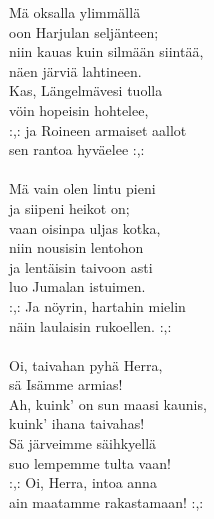 
            Mä oksalla ylimmällä  \\
            oon Harjulan seljänteen; \\
            niin kauas kuin silmään siintää, \\
            näen järviä lahtineen. \\
            Kas, Längelmävesi tuolla  \\
            vöin hopeisin hohtelee, \\
            :,: ja Roineen armaiset aallot  \\
            sen rantoa hyväelee :,: \\
\hspace{10mm} \\
            Mä vain olen lintu pieni  \\
            ja siipeni heikot on; \\
            vaan oisinpa uljas kotka,  \\
            niin nousisin lentohon \\
            ja lentäisin taivoon asti  \\
            luo Jumalan istuimen. \\
            :,: Ja nöyrin, hartahin mielin \\
            näin laulaisin rukoellen. :,: \\
\hspace{10mm} \\
            Oi, taivahan pyhä Herra, \\
            sä Isämme armias! \\
            Ah, kuink’ on sun maasi kaunis, \\
            kuink’ ihana taivahas! \\
            Sä järveimme säihkyellä \\
            suo lempemme tulta vaan! \\
            :,: Oi, Herra, intoa anna \\
            ain maatamme rakastamaan! :,: \\
